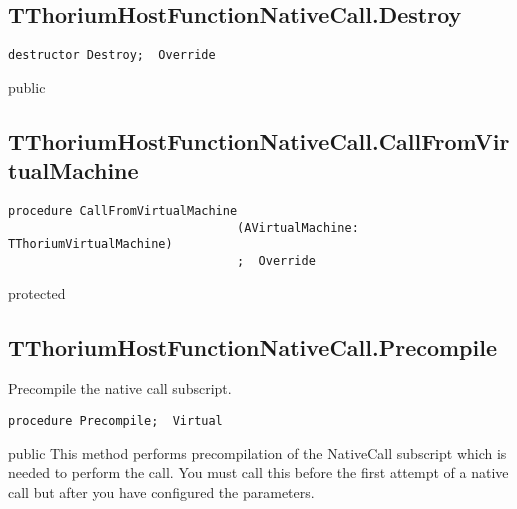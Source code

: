 \subsection{TThoriumHostFunctionNativeCall.Destroy}
\label{thoriumcorepkg:thorium:tthoriumhostfunctionnativecall:destroy}
\begin{FPCList}
\Declaration 

\begin{verbatim}
destructor Destroy;  Override
\end{verbatim}
\Visibility
public
\end{FPCList}
\subsection{TThoriumHostFunctionNativeCall.CallFromVirtualMachine}
\label{thoriumcorepkg:thorium:tthoriumhostfunctionnativecall:callfromvirtualmachine}
\begin{FPCList}
\Declaration 

\begin{verbatim}
procedure CallFromVirtualMachine
                                (AVirtualMachine: TThoriumVirtualMachine)
                                ;  Override
\end{verbatim}
\Visibility
protected
\end{FPCList}
\subsection{TThoriumHostFunctionNativeCall.Precompile}
\label{thoriumcorepkg:thorium:tthoriumhostfunctionnativecall:precompile}
\begin{FPCList}
\Synopsis
Precompile the native call subscript.\Declaration 

\begin{verbatim}
procedure Precompile;  Virtual
\end{verbatim}
\Visibility
public
\Description
This method performs precompilation of the NativeCall subscript which is needed to perform the call. You must call this before the first attempt of a native call but after you have configured the parameters.\end{FPCList}
